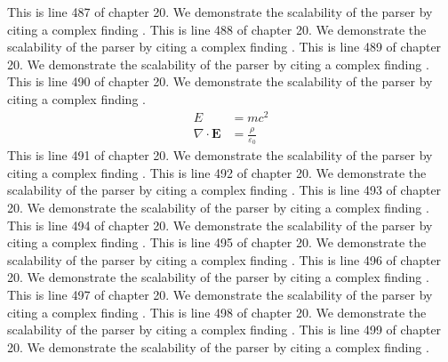 This is line 487 of chapter 20. We demonstrate the scalability of the parser by citing a complex finding \cite{ref20_487}.
This is line 488 of chapter 20. We demonstrate the scalability of the parser by citing a complex finding \cite{ref20_488}.
This is line 489 of chapter 20. We demonstrate the scalability of the parser by citing a complex finding \cite{ref20_489}.
This is line 490 of chapter 20. We demonstrate the scalability of the parser by citing a complex finding \cite{ref20_490}.
\begin{align*}
  E &= mc^2 \\
  \nabla \cdot \mathbf{E} &= \frac{\rho}{\varepsilon_0}
\end{align*}
This is line 491 of chapter 20. We demonstrate the scalability of the parser by citing a complex finding \cite{ref20_491}.
This is line 492 of chapter 20. We demonstrate the scalability of the parser by citing a complex finding \cite{ref20_492}.
This is line 493 of chapter 20. We demonstrate the scalability of the parser by citing a complex finding \cite{ref20_493}.
This is line 494 of chapter 20. We demonstrate the scalability of the parser by citing a complex finding \cite{ref20_494}.
This is line 495 of chapter 20. We demonstrate the scalability of the parser by citing a complex finding \cite{ref20_495}.
This is line 496 of chapter 20. We demonstrate the scalability of the parser by citing a complex finding \cite{ref20_496}.
This is line 497 of chapter 20. We demonstrate the scalability of the parser by citing a complex finding \cite{ref20_497}.
This is line 498 of chapter 20. We demonstrate the scalability of the parser by citing a complex finding \cite{ref20_498}.
This is line 499 of chapter 20. We demonstrate the scalability of the parser by citing a complex finding \cite{ref20_499}.
